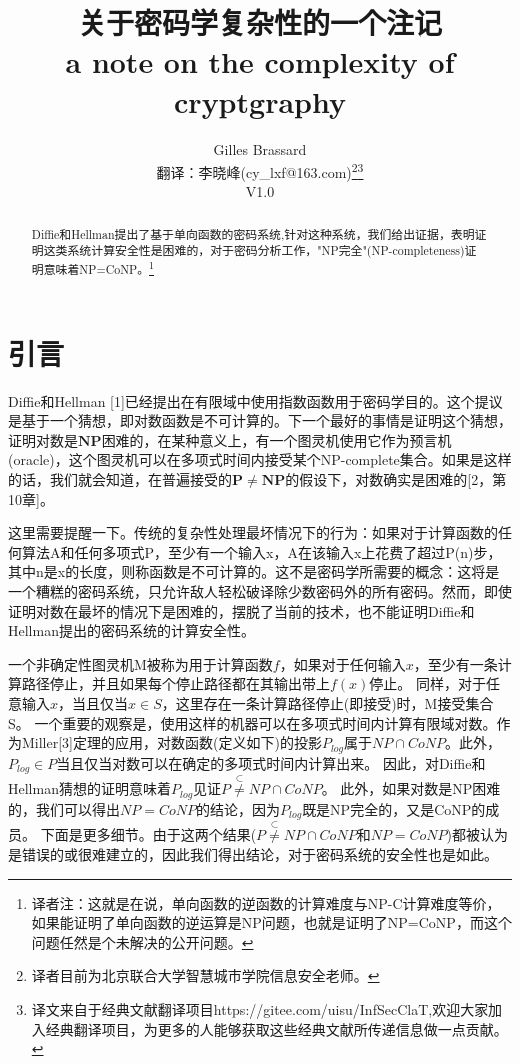 \documentclass[]{article}
\title{关于密码学复杂性的一个注记\\
\small{a note on the complexity of cryptgraphy}}
\author{Gilles Brassard \\
{\small  翻译：李晓峰(cy\_lxf@163.com)}\footnote{译者目前为北京联合大学智慧城市学院信息安全老师。}\footnote{译文来自于经典文献翻译项目https://gitee.com/uisu/InfSecClaT,欢迎大家加入经典翻译项目，为更多的人能够获取这些经典文献所传递信息做一点贡献。}\\
{\small  V1.0}
}
\begin{document}
	
	\maketitle
	
	\begin{abstract}
		Diffie和Hellman提出了基于单向函数的密码系统,针对这种系统，我们给出证据，表明证明这类系统计算安全性是困难的，对于密码分析工作，"NP完全"(NP-completeness)证明意味着NP=CoNP。\footnote{译者注：这就是在说，单向函数的逆函数的计算难度与NP-C计算难度等价，如果能证明了单向函数的逆运算是NP问题，也就是证明了NP=CoNP，而这个问题任然是个未解决的公开问题。}
	\end{abstract}

	\section{引言}
	
	Diffie和Hellman [1]已经提出在有限域中使用指数函数用于密码学目的。这个提议是基于一个猜想，即对数函数是不可计算的。下一个最好的事情是证明这个猜想，证明对数是$\mathbf{NP}$困难的，在某种意义上，有一个图灵机使用它作为预言机(oracle)，这个图灵机可以在多项式时间内接受某个NP-complete集合。如果是这样的话，我们就会知道，在普遍接受的$\mathbf{P}\neq \mathbf{NP}$的假设下，对数确实是困难的[2，第10章]。
	
	这里需要提醒一下。传统的复杂性处理最坏情况下的行为：如果对于计算函数的任何算法A和任何多项式P，至少有一个输入x，A在该输入x上花费了超过P(n)步，其中n是x的长度，则称函数是不可计算的。这不是密码学所需要的概念：这将是一个糟糕的密码系统，只允许敌人轻松破译除少数密码外的所有密码。然而，即使证明对数在最坏的情况下是困难的，摆脱了当前的技术，也不能证明Diffie和Hellman提出的密码系统的计算安全性。
	
	一个非确定性图灵机M被称为用于计算函数$f$，如果对于任何输入$x$，至少有一条计算路径停止，并且如果每个停止路径都在其输出带上$f(x)$停止。
	同样，对于任意输入$x$，当且仅当$x\in S$，这里存在一条计算路径停止(即接受)时，M接受集合S。
	一个重要的观察是，使用这样的机器可以在多项式时间内计算有限域对数。作为Miller[3]定理的应用，对数函数(定义如下)的投影$P_{log}$属于$NP\cap CoNP$。此外，$P_{log}\in P$当且仅当对数可以在确定的多项式时间内计算出来。
	因此，对Diffie和Hellman猜想的证明意味着$P_{log}$见证$P\stackrel{\subset}{\neq} NP \cap CoNP$。
	此外，如果对数是NP困难的，我们可以得出$NP=CoNP$的结论，因为$P_{log}$既是NP完全的，又是CoNP的成员。
	下面是更多细节。由于这两个结果($P\stackrel{\subset}{\neq} NP \cap CoNP$和$NP=CoNP$)都被认为是错误的或很难建立的，因此我们得出结论，对于密码系统的安全性也是如此。
	
\end{document}

